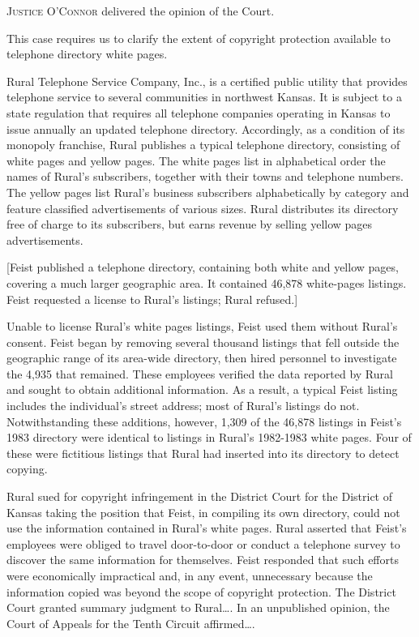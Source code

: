 
\opinion\textsc{Justice O'Connor} delivered the opinion of the Court.

This case requires us to clarify the extent of copyright protection available to
telephone directory white pages.


Rural Telephone Service Company, Inc., is a certified public utility that
provides telephone service to several communities in northwest Kansas. It is
subject to a state regulation that requires all telephone companies operating
in Kansas to issue annually an updated telephone directory. Accordingly, as a
condition of its monopoly franchise, Rural publishes a typical telephone
directory, consisting of white pages and yellow pages. The white pages list in
alphabetical order the names of Rural's subscribers, together with their towns
and telephone numbers. The yellow pages list Rural's business subscribers
alphabetically by category and feature classified advertisements of various
sizes. Rural distributes its directory free of charge to its subscribers, but
earns revenue by selling yellow pages advertisements.

[Feist published a telephone directory, containing both white and yellow pages,
covering a much larger geographic area. It contained 46,878 white-pages
listings. Feist requested a license to Rural's listings; Rural refused.]

Unable to license Rural's white pages listings, Feist used them without Rural's
consent. Feist began by removing several thousand listings that fell outside
the geographic range of its area-wide directory, then hired personnel to
investigate the 4,935 that remained. These employees verified the data reported
by Rural and sought to obtain additional information. As a result, a typical
Feist listing includes the individual's street address; most of Rural's
listings do not. Notwithstanding these additions, however, 1,309 of the 46,878
listings in Feist's 1983 directory were identical to listings in Rural's
1982-1983 white pages. Four of these were fictitious listings that Rural had
inserted into its directory to detect copying.

Rural sued for copyright infringement in the District Court for the District of
Kansas taking the position that Feist, in compiling its own directory, could
not use the information contained in Rural's white pages. Rural asserted that
Feist's employees were obliged to travel door-to-door or conduct a telephone
survey to discover the same information for themselves. Feist responded that
such efforts were economically impractical and, in any event, unnecessary
because the information copied was beyond the scope of copyright protection.
The District Court granted summary judgment to Rural\ldots. In an
unpublished opinion, the Court of Appeals for the Tenth Circuit affirmed\dots.

